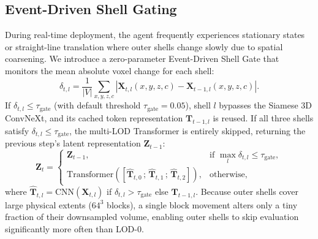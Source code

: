 \documentclass{svproc}
\begin{document}
\subsection{Event-Driven Shell Gating}
During real-time deployment, the agent frequently experiences stationary states or straight-line translation where outer shells change slowly due to spatial coarsening. We introduce a zero-parameter Event-Driven Shell Gate that monitors the mean absolute voxel change for each shell:
\begin{equation}
\delta_{t, l} = \frac{1}{|V|} \sum_{x,y,z,c} \left| \mathbf{X}_{t, l}(x,y,z,c) - \mathbf{X}_{t-1, l}(x,y,z,c) \right|.
\end{equation}
If $\delta_{t, l} \le \tau_{\text{gate}}$ (with default threshold $\tau_{\text{gate}} = 0.05$), shell $l$ bypasses the Siamese 3D ConvNeXt, and its cached token representation $\mathbf{T}_{t-1, l}$ is reused. If all three shells satisfy $\delta_{t, l} \le \tau_{\text{gate}}$, the multi-LOD Transformer is entirely skipped, returning the previous step's latent representation $\mathbf{Z}_{t-1}$:
\begin{equation}
\mathbf{Z}_t = \begin{cases}
\mathbf{Z}_{t-1}, & \text{if } \max_{l} \delta_{t, l} \le \tau_{\text{gate}}, \\
\mathrm{Transformer}\left(\left[\hat{\mathbf{T}}_{t,0}\,;\,\hat{\mathbf{T}}_{t,1}\,;\,\hat{\mathbf{T}}_{t,2}\right]\right), & \text{otherwise},
\end{cases}
\end{equation}
where $\hat{\mathbf{T}}_{t,l} = \mathrm{CNN}(\mathbf{X}_{t,l})$ if $\delta_{t,l} > \tau_{\text{gate}}$ else $\mathbf{T}_{t-1,l}$. Because outer shells cover large physical extents ($64^3$ blocks), a single block movement alters only a tiny fraction of their downsampled volume, enabling outer shells to skip evaluation significantly more often than LOD-0.
\end{document}
